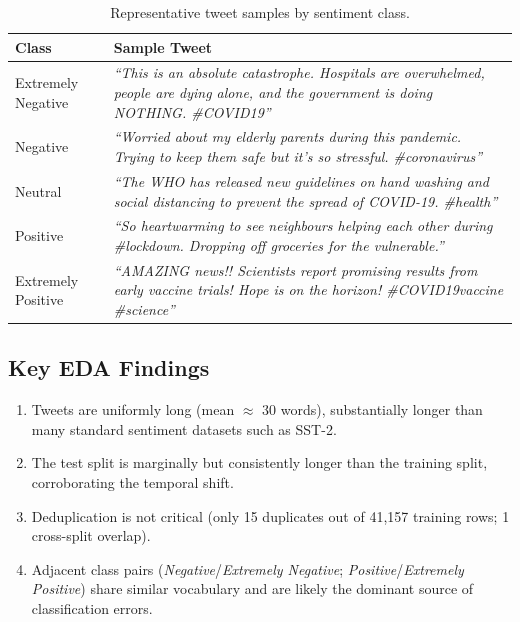 \begin{table}[H]
    \centering
    \caption{Representative tweet samples by sentiment class.}
    \label{tab:representative_samples}
    \begin{tabularx}{\textwidth}{l X}
        \toprule
        \textbf{Class} & \textbf{Sample Tweet} \\
        \midrule
        Extremely Negative
            & \textit{``This is an absolute catastrophe. Hospitals are overwhelmed, people are dying alone, and the government is doing NOTHING. \#COVID19''}\\
        \addlinespace
        Negative
            & \textit{``Worried about my elderly parents during this pandemic. Trying to keep them safe but it's so stressful. \#coronavirus''}\\
        \addlinespace
        Neutral
            & \textit{``The WHO has released new guidelines on hand washing and social distancing to prevent the spread of COVID-19. \#health''}\\
        \addlinespace
        Positive
            & \textit{``So heartwarming to see neighbours helping each other during \#lockdown. Dropping off groceries for the vulnerable.''}\\
        \addlinespace
        Extremely Positive
            & \textit{``AMAZING news!! Scientists report promising results from early vaccine trials! Hope is on the horizon! \#COVID19vaccine \#science''}\\
        \bottomrule
    \end{tabularx}
\end{table}

\subsection{Key EDA Findings}

\begin{enumerate}
    \item Tweets are uniformly long (mean $\approx$ 30 words), substantially longer than many standard sentiment datasets such as SST-2.
    \item The test split is marginally but consistently longer than the training split, corroborating the temporal shift.
    \item Deduplication is not critical (only 15 duplicates out of 41,157 training rows; 1 cross-split overlap).
    \item Adjacent class pairs (\textit{Negative}/\textit{Extremely Negative}; \textit{Positive}/\textit{Extremely Positive}) share similar vocabulary and are likely the dominant source of classification errors.
\end{enumerate}
